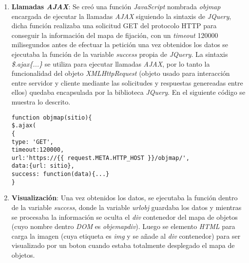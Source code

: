 \begin{enumerate}[label=\alph*) ,font=\bfseries] 
\item \textbf{Llamadas \textit{AJAX}}: Se creó una función \textit{JavaScript} nombrada 
\textit{objmap} encargada de ejecutar la llamadas \textit{AJAX} siguiendo la sintaxis de 
\textit{JQuery}, dicha función realizaba una solicitud GET del protocolo HTTP para conseguir
la información del mapa de fijación, con un \textit{timeout} 120000 milisegundos antes de efectuar
la petición una vez obtenidos los datos se ejecutaba la función de la variable \textit{success} 
propia de \textit{JQuery}. La sintaxis \textit{\$.ajax\{...\}} se utiliza para ejecutar llamadas
\textit{AJAX}, por lo tanto la funcionalidad del objeto \textit{XMLHttpRequest} (objeto usado para 
interacción entre servidor y cliente mediante las solicitudes y respuestas genereadas entre ellos) 
quedaba encapsulada por la biblioteca \textit{JQuery}. En el siguiente código se muestra lo descrito.
\newpage
\begin{lstlisting}[style=Java, caption={Obtención \textit{WebObjects}.}]
function objmap(sitio){
$.ajax(
{
type: 'GET',
timeout:120000,
url:'https://{{ request.META.HTTP_HOST }}/objmap/',
data:{url: sitio},
success: function(data){...}
}
\end{lstlisting}
\item \textbf{Visualización}: Una vez obtenidos los datos, se ejecutaba la función dentro de la variable \textit{success}, donde la variable \textit{urlobj} guardaba los datos y mientras se 
procesaba la información se oculta el \textit{div} contenedor del mapa de objetos (cuyo nombre
dentro \textit{DOM} es \textit{objemapdiv}). Luego se elemento \textit{HTML} para carga la imagen
(cuya etiqueta es \textit{img} y se añade al \textit{div} contenedor) para ser visualizado por un 
boton cuando estaba totalmente desplegado el mapa de objetos.
\begin{lstlisting}[style=Java, caption={Obtención \textit{WebObjects}.}]


\end{lstlisting}
\end{enumerate}
